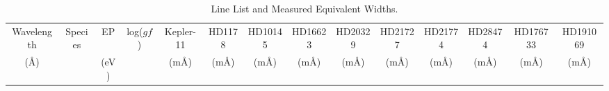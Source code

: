 \documentclass[oneside]{emulateapj}
\begin{document}
\pagebreak
\begin{table}
\caption{Line List and Measured Equivalent Widths.}
\label{tbl:ews}
\centering 
\begin{tabular}{cccccccccccccc} 
\hline
\hline
{Wavelength} & Species & EP & log($gf$) & Kepler-11 & HD1178 & HD10145 & HD16623 & HD20329 & HD21727 & HD21774 & HD28474 & HD176733 & HD191069 \\
 (\r{A}) &  & (eV) &  & (m\r{A}) & (m\r{A}) & (m\r{A}) & (m\r{A}) & (m\r{A}) & (m\r{A}) & (m\r{A}) & (m\r{A}) & (m\r{A}) & (m\r{A}) \\
\hline
\hline       
\end{tabular}


\end{table}


\pagebreak
\end{document}
